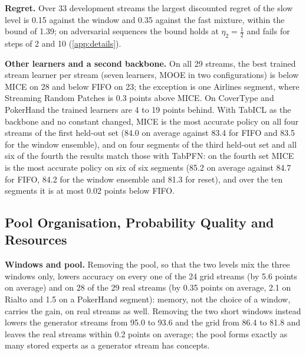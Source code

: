 \documentclass[11pt]{article}
\theoremstyle{plain}
\theoremstyle{definition}
\theoremstyle{remark}
\newcommand{\method}{\textsc{MICE}}   %
\begin{document}
\textbf{Regret.} Over 33 development streams the largest
discounted regret of the slow level is 0.15 against the window and 0.35 against the fast mixture, within the bound
of 1.39; on adversarial sequences the bound holds at $\eta_2=\tfrac12$ and fails for steps of 2 and 10
(\cref{app:details}).

\textbf{Other learners and a second backbone.} On all 29 streams, the best trained
stream learner per stream (seven learners, MOOE in two configurations) is below \method{} on 28 and below FIFO on
23; the exception is one Airlines segment, where Streaming Random Patches is 0.3 points above \method{}. On
CoverType and PokerHand the trained learners are 4 to 19 points behind. With TabICL as the backbone and no constant changed, \method{} is the most accurate policy on all four streams of the
first held-out set (84.0 on average against 83.4 for FIFO and 83.5 for the window ensemble), and on four segments
of the third held-out set and all six of the fourth the results match those with TabPFN: on the fourth set \method{} is the most accurate policy on six of six segments (85.2 on average against
84.7 for FIFO, 84.2 for the window ensemble and 81.3 for reset), and over the ten segments it is at most 0.02 points
below FIFO.

\subsection{Pool Organisation, Probability Quality and Resources}
\label{sec:ablation}

\textbf{Windows and pool.} Removing the pool, so that the two levels mix the three windows only, lowers accuracy on
every one of the 24 grid streams (by 5.6 points on average) and on 28 of the 29 real streams (by 0.35 points on
average, 2.1 on Rialto and 1.5 on a PokerHand segment): memory, not the choice of a window, carries the gain, on real
streams as well. Removing the two short windows instead lowers the generator streams from 95.0 to 93.6 and the grid
from 86.4 to 81.8 and leaves the real streams within 0.2 points on average; the pool forms exactly as many stored
experts as a generator stream has concepts.
\end{document}
